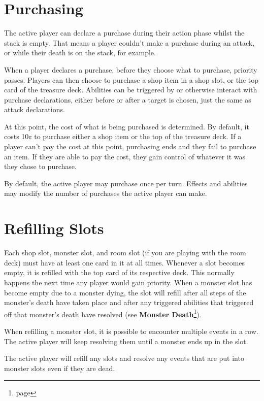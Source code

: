\documentclass[10pt, a4paper, twoside]{article} %
\begin{document}
    \section{Purchasing}
    \label{purchasing}
    The active player can declare a purchase during their action phase whilst the stack is empty. That means a player couldn’t make a purchase during an attack, or while their death is on the stack, for example.

    When a player declares a purchase, before they choose what to purchase, priority passes. Players can then choose to purchase a shop item in a shop slot, or the top card of the treasure deck. Abilities can be triggered by or otherwise interact with purchase declarations, either before or after a target is chosen, just the same as attack declarations.

    At this point, the cost of what is being purchased is determined. By default, it costs 10¢ to purchase either a shop item or the top of the treasure deck. If a player can’t pay the cost at this point, purchasing ends and they fail to purchase an item. If they are able to pay the cost, they gain control of whatever it was they chose to purchase.

    By default, the active player may purchase once per turn. Effects and abilities may modify the number of purchases the active player can make.

    \section{Refilling Slots}
    \label{refilling}
    Each shop slot, monster slot, and room slot (if you are playing with the room deck) must have at least one card in it at all times. Whenever a slot becomes empty, it is refilled with the top card of its respective deck. This normally happens the next time any player would gain priority. When a monster slot has become empty due to a monster dying, the slot will refill after all steps of the monster’s death have taken place and after any triggered abilities that triggered off that monster’s death have resolved (see \textbf{Monster Death}\footnote{page \pageref{monsterdeath}}).

    When refilling a monster slot, it is possible to encounter multiple events in a row. The active player will keep resolving them until a monster ends up in the slot.

    The active player will refill any slots and resolve any events that are put into monster slots even if they are dead.
\end{document}

